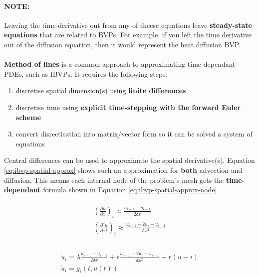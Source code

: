 \documentclass{article}
\begin{document}
\paragraph{\textbf{NOTE:}} Leaving the time-derivative out from any of theese equations leave \textbf{steady-state equations} that are related to BVPs. For example, if you left the time derivative out of the diffusion equation, then it would represent the heat diffusion BVP.
\paragraph{}

\textbf{Method of lines} is a common approach to approximating time-dependant PDEs, such as IBVPs. It requires the following steps:
\begin{enumerate}
	\item discretise spatial dimension(s) using \textbf{finite differences}
	\item discretise time using \textbf{explicit time-stepping with the forward Euler scheme}
	\item convert disrectisation into matrix/vector form so it can be solved a system of equations
\end{enumerate}

Central differences can be used to approximate the spatial derivative(s). Equation \ref{eq:ibvp-spatial-approx} shows such an approximation for \textbf{both} advection and diffusion. This means each internal node of the problem's mesh gets the \textbf{time-dependant} formula shown in Equation \ref{eq:ibvp-spatial-approx-node}.

\begin{multline} \\
	{\left( \frac{\partial u}{\partial x} \right)}_i \approx \frac{u_{i + 1} - u_{i - 1}}{2\delta x} \\
	{\left( \frac{\partial^2 u}{\partial x^2} \right)}_i \approx \frac{u_{i + 1} - 2u_i + u_{i - 1}}{\delta x^2} \\
	\label{eq:ibvp-spatial-approx}
\end{multline}

\begin{multline} \\
	\dot{u}_i = \lambda \frac{u_{i + 1} - u_{i - 1}}{2\delta x} + \epsilon \frac{u_{i + 1} - 2u_i + u_{i - 1}}{\delta x^2} + r(u-i) \\
	\dot{u}_i = g_i(t, u(t)) \\
	\label{eq:ibvp-spatial-approx-node}
\end{multline}
\end{document}
